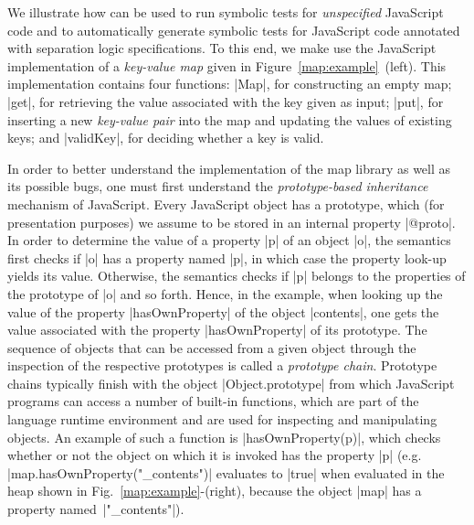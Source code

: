 
We illustrate how \jilette can be used to run symbolic tests for \emph{unspecified} JavaScript code 
and to automatically generate symbolic tests for JavaScript code annotated with separation logic specifications. 
To this end, we make use the JavaScript implementation 
of a  \emph{key-value map} given in Figure~\ref{map:example}~(left). 
This implementation contains four functions: 
\jsinline|Map|, for constructing an empty map;
\jsinline|get|, for retrieving the value associated with the key given as input;
\jsinline|put|, for inserting a new \emph{key-value pair} into the map and updating the values of existing keys; and
\jsinline|validKey|, for deciding whether a key is valid.

In order to better understand the implementation of the map library as well as its possible bugs, 
one must first understand the \emph{prototype-based inheritance} mechanism of JavaScript. 
Every JavaScript object has a prototype, which (for presentation purposes) we assume to 
be stored  in an internal property \jsinline|@proto|. In order to determine the value of a property
\jsinline|p| of an object \jsinline|o|, the semantics first checks if \jsinline|o| has a 
property named \jsinline|p|, in which case the property look-up yields its value. Otherwise, the 
semantics checks if \jsinline|p| belongs to the properties of the prototype of \jsinline|o| and so 
forth. Hence, in the example, when looking up the value of the property \jsinline|hasOwnProperty|
of the object \jsinline|contents|, one gets the value associated with the property  \jsinline|hasOwnProperty|
of its prototype.
The sequence of objects that can be accessed from a given object through the inspection 
of the respective prototypes is called a \emph{prototype chain}.
Prototype chains typically finish with the object \jsinline|Object.prototype| from which JavaScript 
programs can access a number of built-in functions, which are part of the language runtime environment and are used for inspecting and manipulating objects.
An example of such a function is \jsinline|hasOwnProperty(p)|, which checks whether or not the object 
on which it is invoked has the property \jsinline|p| (e.g. {\small \jsinline|map.hasOwnProperty("_contents")|}
evaluates to \jsinline|true| when evaluated in the heap shown in Fig.~\ref{map:example}-(right), 
because the object \jsinline|map| has a property named~\jsinline|"_contents"|). 

